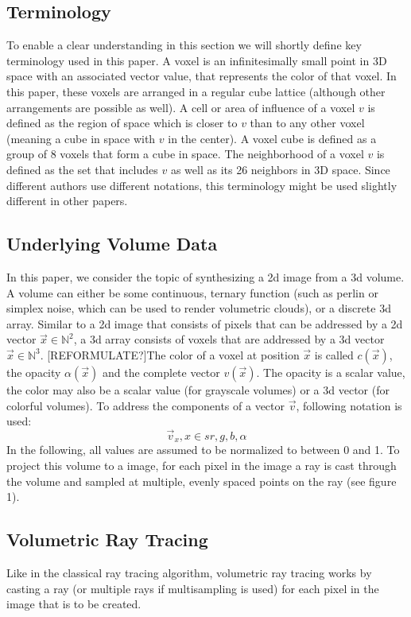 {\subsection{Terminology}
To enable a clear understanding in this section we will shortly define key terminology used in this paper. A voxel is an infinitesimally small point in 3D space with an associated vector value, that represents the color of that voxel. In this paper, these voxels are arranged in a regular cube lattice (although other arrangements are possible as well). A cell or area of influence of a voxel $v$ is defined as the region of space which is closer to $v$ than to any other voxel (meaning a cube in space with $v$ in the center). A voxel cube is defined as a group of 8 voxels that form a cube in space. The neighborhood of a voxel $v$ is defined as the set that includes $v$ as well as its 26 neighbors in 3D space. Since different authors use different notations, this terminology might be used slightly different in other papers.
\subsection{Underlying Volume Data}
In this paper, we consider the topic of synthesizing a 2d image from a 3d volume.
A volume can either be some continuous, ternary function (such as perlin or simplex noise\cite{10.1145/325165.325247}, which can be used to render volumetric clouds\cite{haggstrom2018real}), or a discrete 3d array\cite{511}.
Similar to a 2d image that consists of pixels that can be addressed by a 2d vector $\vec{x} \in \mathbb{N}^2$, a 3d array consists of voxels that are addressed by a 3d vector $\vec{x} \in \mathbb{N}^3$. [REFORMULATE?]The color of a voxel at position $\vec{x}$ is called $c(\vec{x})$, the opacity $\alpha(\vec{x})$ and the complete vector $v(\vec{x})$. The opacity is a scalar value, the color may also be a scalar value (for grayscale volumes) or a 3d vector (for colorful volumes).
To address the components of a vector $\vec{v}$, following notation is used:
\begin{equation}
	\vec{v}_{x}, x \in s{r, g, b, \alpha}
\end{equation}
 In the following, all values are assumed to be normalized to between 0 and 1. To project this volume to a image, for each pixel in the image a ray is cast through the volume and sampled at multiple, evenly spaced points on the ray (see figure 1)\cite{10.1145/78964.78965}.

\subsection{Volumetric Ray Tracing}
Like in the classical ray tracing algorithm, volumetric ray tracing works by casting a ray (or multiple rays if multisampling is used) for each pixel in the image that is to be created.

}
